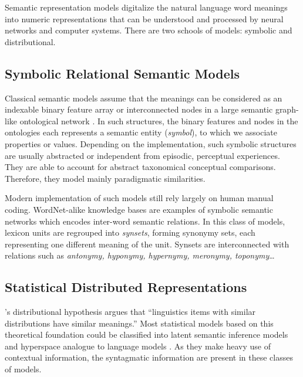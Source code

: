 Semantic representation models digitalize the natural language word meanings into numeric representations that can be understood and processed by neural networks and computer systems. There are two schools of models: symbolic and distributional.

\subsection{Symbolic Relational Semantic Models}

\label{subsection:symbolicembedding}
Classical semantic models assume that the meanings can be considered as an indexable binary feature array \parencite{smithSemanticMemoryPsychological1974} or interconnected nodes in a large semantic graph-like ontological network \parencite{collinsRetrievalTimeSemantic1969}. In such structures, the binary features and nodes in the ontologies each represents a semantic entity (\emph{symbol}), to which we associate properties or values. Depending on the implementation, such symbolic structures are usually abstracted or independent from episodic, perceptual experiences. They are able to account for abstract taxonomical conceptual comparisons. Therefore, they model mainly paradigmatic similarities. 

Modern implementation of such models still rely largely on human manual coding. WordNet-alike knowledge bases \parencite{millerWordNetLexicalDatabase1995, millerWordNetElectronicLexical1998, sagotBuildingFreeFrench2008, pradetWonefImprovedExpanded2014} are examples of symbolic semantic networks which encodes inter-word semantic relations. In this class of models, lexicon units are regrouped into \emph{synsets}, forming synonymy sets, each representing one different meaning of the unit. Synsets are interconnected with relations such as \emph{antonymy, hyponymy, hypernymy, meronymy, toponymy}\dots

\subsection{Statistical Distributed Representations}

\label{subsection:statisticalembedding}

\textcite{harrisDistributionalStructure1954}'s distributional hypothesis argues that ``linguistics items with similar distributions have similar meanings.'' Most statistical models based on this theoretical foundation could be classified into latent semantic inference models \parencite{deerwesterUnitedStatesPatent1989, penningtonGloveGlobalVectors2014} and hyperspace analogue to language models \parencite{burgessHyperspaceAnalogueLanguage1995, mikolovEfficientEstimationWord2013, levyDependencyBasedWordEmbeddings2014}. As they make heavy use of contextual information, the syntagmatic information are present in these classes of models.

